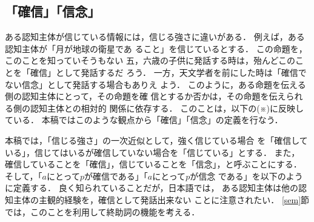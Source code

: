 \subsection{「確信」「信念」} \label{kandb}
ある認知主体が信じている情報には，信じる強さに違いがある．
例えば，ある認知主体が「月が地球の衛星であ
ること」を信じているとする．  この命題を，このことを知っていそうもない
五，六歳の子供に発話する時は，殆んどこのことを「確信」として発話するだ
ろう．  一方，天文学者を前にした時は「確信でない信念」として発話する場合もありえ
よう．  このように，ある命題を伝える側の認知主体にとって，その命題を確
信とするか否かは，その命題を伝えられる側の認知主体との相対的
関係に依存する．  このことは，以下の(※)に反映している．
本稿ではこのような観点から「確信」「信念」の定義を行なう．

本稿では，「信じる強さ」の一次近似として，強く信じている場合
を「確信している」，信じてはいるが確信していない場合を「信じている」とする．  また，
確信していることを「確信」，信じていることを「信念」，と呼ぶことにする．
そして，「\(a\)にとって\(p\)が確信である」「\(a\)にとって\(p\)が信念
である」を以下のように定義する．
良く知られていることだが，日本語では，
ある認知主体は他の認知主体の主観的経験を，確信として発話出来ない
ことに注意されたい．
\ref{sem}節では，このことを利用して終助詞の機能を考える．

